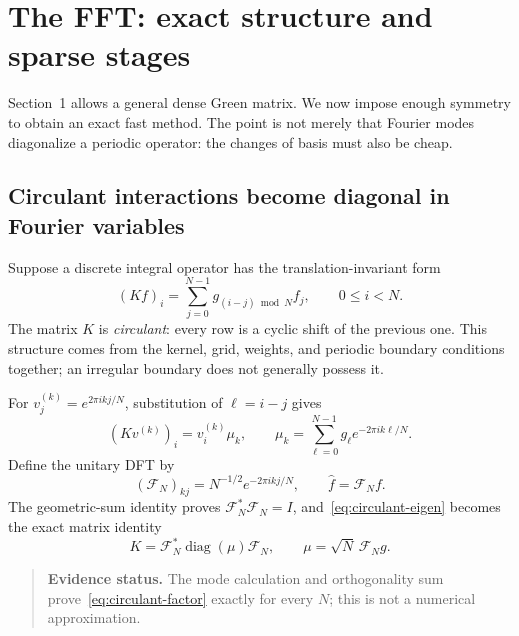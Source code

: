 \documentclass[11pt,a4paper]{article}
\numberwithin{equation}{section}
\newenvironment{evidence}{\begin{quote}\small\color{muted}\textbf{Evidence status.} }{\end{quote}}
\begin{document}
\section{The FFT: exact structure and sparse stages}
\label{sec:fft}

Section~1 allows a general dense Green matrix. We now impose enough symmetry to obtain an exact fast method. The point is not merely that Fourier modes diagonalize a periodic operator: the changes of basis must also be cheap.

\subsection{Circulant interactions become diagonal in Fourier variables}
Suppose a discrete integral operator has the translation-invariant form
\begin{equation}
 (Kf)_i=\sum_{j=0}^{N-1}g_{(i-j)\bmod N}f_j,
 \qquad 0\le i<N.
 \label{eq:circulant}
\end{equation}
The matrix $K$ is \emph{circulant}: every row is a cyclic shift of the previous one. This structure comes from the kernel, grid, weights, and periodic boundary conditions together; an irregular boundary does not generally possess it.

For $v^{(k)}_j=e^{2\pi ikj/N}$, substitution of $\ell=i-j$ gives
\begin{equation}
 (Kv^{(k)})_i=v^{(k)}_i\mu_k,
 \qquad
 \mu_k=\sum_{\ell=0}^{N-1}g_\ell e^{-2\pi ik\ell/N}.
 \label{eq:circulant-eigen}
\end{equation}
Define the unitary DFT by
\begin{equation}
 (\mathcal F_N)_{kj}=N^{-1/2}e^{-2\pi ikj/N},
 \qquad \widehat f=\mathcal F_Nf.
 \label{eq:unitary-dft}
\end{equation}
The geometric-sum identity proves $\mathcal F_N^*\mathcal F_N=I$, and~\eqref{eq:circulant-eigen} becomes the exact matrix identity
\begin{equation}
 K=\mathcal F_N^*\operatorname{diag}(\mu)\mathcal F_N,
 \qquad \mu=\sqrt N\,\mathcal F_Ng.
 \label{eq:circulant-factor}
\end{equation}
\begin{evidence}
The mode calculation and orthogonality sum prove~\eqref{eq:circulant-factor} exactly for every $N$; this is not a numerical approximation.
\end{evidence}
\end{document}
